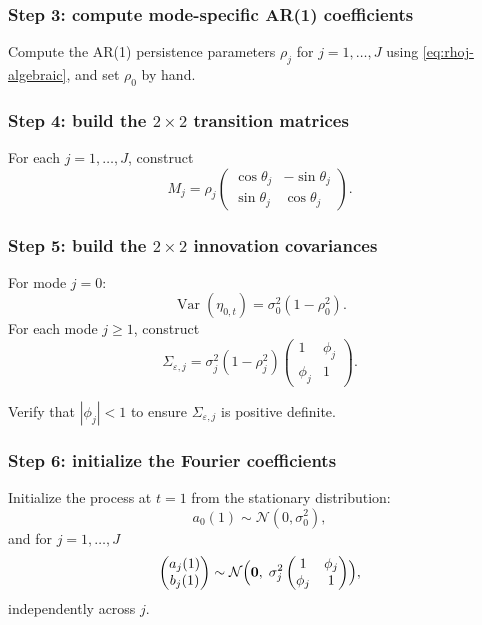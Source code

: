 \documentclass[answers,12pt,addpoints]{exam}
\begin{document}
\subsubsection*{Step 3: compute mode-specific AR(1) coefficients}

Compute the AR(1) persistence parameters $\rho_j$ for $j=1,\dots,J$ using \eqref{eq:rhoj-algebraic}, and set $\rho_0$ by hand.

\subsubsection*{Step 4: build the $2\times2$ transition matrices}

For each $j=1,\dots,J$, construct
\[
  M_j
  =
  \rho_j
  \begin{pmatrix}
    \cos\theta_j & -\sin\theta_j \\
    \sin\theta_j & \cos\theta_j
  \end{pmatrix}.
\]

\subsubsection*{Step 5: build the $2\times2$ innovation covariances}

For mode $j=0$:
\[
  \operatorname{Var}(\eta_{0,t}) = \sigma_0^2 (1 - \rho_0^2).
\]
For each mode $j \ge 1$, construct
\[
  \Sigma_{\varepsilon,j}
  =
  \sigma_j^2(1 - \rho_j^2)
  \begin{pmatrix} 1 & \phi_j \\ \phi_j & 1 \end{pmatrix}.
\]

Verify that $|\phi_j| < 1$ to ensure $\Sigma_{\varepsilon,j}$ is positive definite.

\subsubsection*{Step 6: initialize the Fourier coefficients}

Initialize the process at $t = 1$ from the stationary distribution:
\[
  a_0(1) \sim \mathcal{N}(0, \sigma_0^2),
\]
and for $j = 1,\dots,J$
\[
  \begin{pmatrix} a_j(1) \\ b_j(1) \end{pmatrix}
  \sim
  \mathcal{N}\Bigl(\mathbf{0},\; \sigma_j^2 
  \begin{pmatrix} 1 & \phi_j \\ \phi_j & 1 \end{pmatrix}\Bigr),
\]
independently across $j$.
\end{document}
